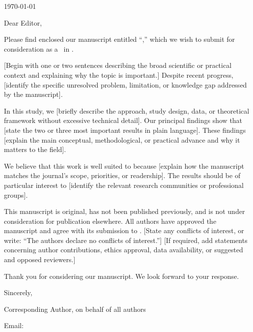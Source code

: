 \documentclass[11pt]{article}
\newcommand{\guidance}[1]{\textcolor{placeholder}{[#1]}}
\begin{document}
\hfill\today\par
\EditorName\par
\EditorTitle\par
\textit{\JournalName}

Dear Editor,

Please find enclosed our manuscript entitled ``\ManuscriptTitle,'' which we
wish to submit for consideration as a \ArticleType\ in \textit{\JournalName}.

\guidance{Begin with one or two sentences describing the broad scientific or
practical context and explaining why the topic is important.} Despite recent
progress, \guidance{identify the specific unresolved problem, limitation, or
knowledge gap addressed by the manuscript}.

In this study, we \guidance{briefly describe the approach, study design, data,
or theoretical framework without excessive technical detail}. Our principal
findings show that \guidance{state the two or three most important results in
plain language}. These findings \guidance{explain the main conceptual,
methodological, or practical advance and why it matters to the field}.

We believe that this work is well suited to \textit{\JournalName} because
\guidance{explain how the manuscript matches the journal's scope, priorities,
or readership}. The results should be of particular interest to
\guidance{identify the relevant research communities or professional groups}.

This manuscript is original, has not been published previously, and is not
under consideration for publication elsewhere. All authors have approved the
manuscript and agree with its submission to \textit{\JournalName}.
\guidance{State any conflicts of interest, or write: ``The authors declare no
conflicts of interest.''} \guidance{If required, add statements concerning
author contributions, ethics approval, data availability, or suggested and
opposed reviewers.}

Thank you for considering our manuscript. We look forward to your response.

Sincerely,\par
\vspace{0.22in}

\begingroup
\setlength{\parskip}{2pt}
{\bfseries\CorrespondenceAuthorName}\par
Corresponding Author, on behalf of all authors\par
\CorrespondenceAuthorAffiliation\par
\CorrespondenceAuthorAddress\par
Email: \href{mailto:\CorrespondenceAuthorEmail}{\CorrespondenceAuthorEmail}
\endgroup
\end{document}
